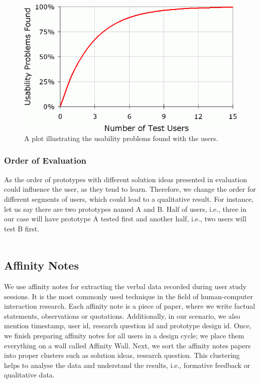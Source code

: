 \begin{figure}[hbt!]
	\centering
	\includegraphics[width=\linewidth]{figures/fiveplot}
	\caption{A plot illustrating the usability problems found with the users.\cite{5users}}
	\label{fig:5plot}
\end{figure}

\subsubsection{Order of Evaluation}

As the order of prototypes with different solution ideas presented in evaluation could influence the user, as they tend to learn. Therefore, we change the order for different segments of users, which could lead to a qualitative result. For instance, let us say there are two prototypes named A and B. Half of users, i.e., three in our case will have prototype A tested first and another half, i.e., two users will test B first. \\ \\

\subsection{Affinity Notes}

We use affinity notes \cite{affinity} for extracting the verbal data recorded during user study sessions. It is the most commonly used technique in the field of human-computer interaction research. Each affinity note is a piece of paper, where we write factual statements, observations or quotations. Additionally, in our scenario, we also mention timestamp, user id, research question id and prototype design id. Once, we finish preparing affinity notes for all users in a design cycle; we place them everything on a wall called Affinity Wall. Next, we sort the affinity notes papers into proper clusters such as solution ideas, research question. This clustering helps to analyse the data and understand the results, i.e., formative feedback or qualitative data. \\ \\

